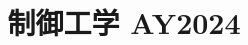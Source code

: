 \documentclass[11pt,a4paper]{article}
\title{制御工学 AY2024}
\author{}
\date{}
\begin{document}
\maketitle


\bigskip

\end{document}
